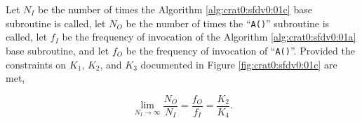 \begin{vworklemmastatement}
\label{lem:crat0:sfdv0:sprx0:02}
Let $N_I$ be the number of times the Algorithm \ref{alg:crat0:sfdv0:01c} 
base subroutine
is called, let $N_O$ be the number of times the 
``\texttt{A()}'' subroutine is called, let
$f_I$ be the frequency of invocation of the 
Algorithm \ref{alg:crat0:sfdv0:01a} 
base subroutine, and let 
$f_O$ be the frequency of invocation of 
``\texttt{A()}''.  Provided the constraints
on $K_1$, $K_2$, and $K_3$ documented in
Figure \ref{fig:crat0:sfdv0:01c} are met,

\begin{equation}
\label{eq:lem:crat0:sfdv0:sprx0:02:01}
\lim_{N_I\rightarrow\infty}\frac{N_O}{N_I}
=
\frac{f_O}{f_I}
=
\frac{K_2}{K_4} . 
\end{equation} 
\end{vworklemmastatement}
